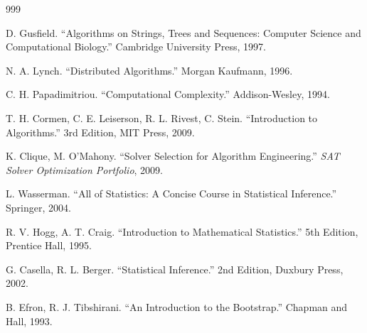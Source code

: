 ﻿\documentclass[a4paper,12pt]{article}
\theoremstyle{definition}
\begin{document}
\begin{thebibliography}{999}

 D. Gusfield. ``Algorithms on Strings, Trees and Sequences: Computer Science and Computational Biology.'' Cambridge University Press, 1997.

 N. A. Lynch. ``Distributed Algorithms.'' Morgan Kaufmann, 1996.

 C. H. Papadimitriou. ``Computational Complexity.'' Addison-Wesley, 1994.

 T. H. Cormen, C. E. Leiserson, R. L. Rivest, C. Stein. ``Introduction to Algorithms.'' 3rd Edition, MIT Press, 2009.

 K. Clique, M. O'Mahony. ``Solver Selection for Algorithm Engineering.'' \textit{SAT Solver Optimization Portfolio}, 2009.


 L. Wasserman. ``All of Statistics: A Concise Course in Statistical Inference.'' Springer, 2004.

 R. V. Hogg, A. T. Craig. ``Introduction to Mathematical Statistics.'' 5th Edition, Prentice Hall, 1995.

 G. Casella, R. L. Berger. ``Statistical Inference.'' 2nd Edition, Duxbury Press, 2002.

 B. Efron, R. J. Tibshirani. ``An Introduction to the Bootstrap.'' Chapman and Hall, 1993.

\end{thebibliography}
\end{document}
